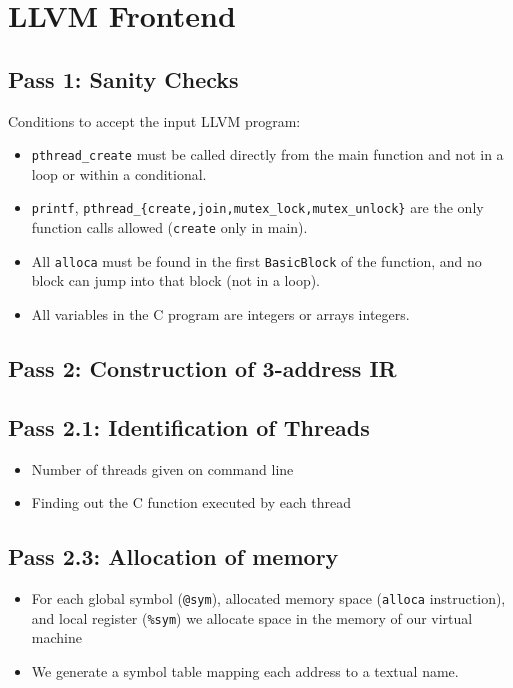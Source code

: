\documentclass{llncs}
\begin{document}
\section{LLVM Frontend}

\subsection*{Pass 1: Sanity Checks}

Conditions to accept the input LLVM program:

\begin{itemize}
\item
  \verb!pthread_create! must be called directly from the main function and not
  in a loop or within a conditional.
\item
  \verb!printf!,
  \verb!pthread_{create,join,mutex_lock,mutex_unlock}! are the only function calls
  allowed (\verb!create! only in main).
\item
  All \verb!alloca! must be found in the first \verb!BasicBlock! of the
  function, and no block can jump into that block (not in a loop).
\item
  All variables in the C program are integers or arrays integers.
\end{itemize}

\subsection*{Pass 2: Construction of 3-address IR}

\subsection*{Pass 2.1: Identification of Threads}

\begin{itemize}
\item Number of threads given on command line
\item Finding out the C function executed by each thread
\end{itemize}

\subsection*{Pass 2.3: Allocation of memory}

\begin{itemize}
\item
  For each global symbol (\verb!@sym!), allocated memory space (\verb!alloca!
  instruction), and local register (\verb!%sym!) we allocate space in the
  memory of our virtual machine
\item
  We generate a symbol table mapping each address to a textual name.
\end{itemize}
\end{document}
